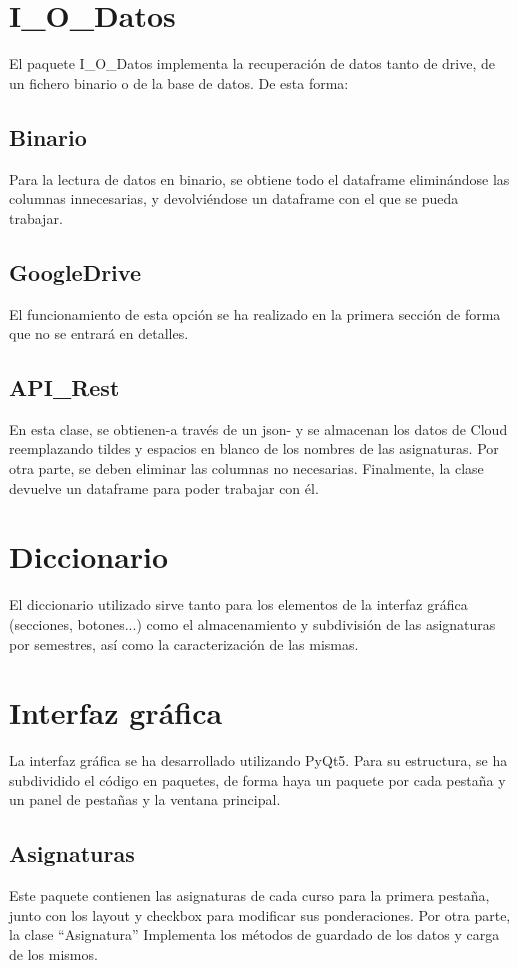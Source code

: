 \section{I\_O\_Datos}
El paquete I\_O\_Datos implementa la recuperación de datos tanto de drive, de un fichero binario o de la base de datos. De esta forma:
\subsection{Binario}
Para la lectura de datos en binario, se obtiene todo el dataframe eliminándose las columnas innecesarias,  y devolviéndose un dataframe con el que se pueda trabajar. 

\subsection{GoogleDrive}
El funcionamiento de esta opción se ha realizado en la primera sección de forma que no se entrará en detalles.

\subsection{API\_Rest}
En esta clase, se obtienen-a través de un json- y se almacenan los datos de Cloud reemplazando tildes y espacios en blanco de los nombres de las asignaturas. Por otra parte, se deben eliminar las columnas no necesarias. 
Finalmente, la clase devuelve un dataframe para poder trabajar con él. 

\section{Diccionario}
El diccionario utilizado sirve tanto para los elementos de la interfaz gráfica (secciones, botones...) como el almacenamiento y subdivisión de las asignaturas por semestres, así como la caracterización de las mismas. 

\section{Interfaz gráfica}
La interfaz gráfica se ha desarrollado utilizando PyQt5. Para su estructura, se ha subdividido el código en paquetes, de forma haya un paquete por cada pestaña y un panel de pestañas y la ventana principal. 
\subsection{Asignaturas}
Este paquete contienen las asignaturas de cada curso para la primera pestaña, junto con los layout y checkbox para modificar sus ponderaciones. Por otra parte, la clase ``Asignatura'' Implementa los métodos de guardado de los datos y carga de los mismos. 

